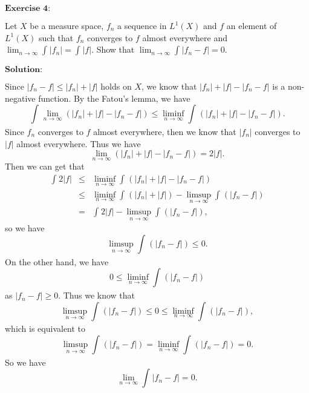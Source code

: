 \documentclass[12pt,a4paper]{ctexart}
\begin{document}
\newpage



$\textbf{Exercise 4:}$

Let $X$ be a measure space, $f_{n}$ a sequence in $L^{1} (X)$ and $f$ an element of $L^{1}(X)$ such that $f_{n}$ converges to $f$ almost everywhere and $\lim_{n \to \infty} \int_{}^{} |f_{n}| = \int_{}^{} |f|$. Show that $\lim_{n \to \infty} \int_{}^{} |f_{n} - f| = 0$.

\vspace{8pt}
$\textbf{Solution:}$

Since $|f_{n} - f| \leq |f_{n}| + |f|$ holds on $X$, we know that $|f_{n}| + |f| - |f_{n} - f|$ is a non-negative function. By the Fatou's lemma, we have
\begin{equation*}
    \int_{}^{} \lim_{n \to \infty} (|f_{n}| + |f| - |f_{n} - f|)  \leq \liminf_{n \to \infty} \int_{}^{} (|f_{n}| + |f| - |f_{n} - f|).
\end{equation*}
Since $f_{n}$ converges to $f$ almost everywhere, then we know that $|f_{n}|$ converges to $|f|$ almost everywhere. Thus we have
\begin{equation*}
    \lim_{n \to \infty} (|f_{n}| + |f| - |f_{n} - f|) = 2 |f|.
\end{equation*}
Then we can get that
\begin{eqnarray*}
\int_{}^{} 2 |f| & \leq & \liminf_{n \to \infty} \int_{}^{} (|f_{n}| + |f| - |f_{n} - f|) \\
& \leq & \liminf_{n \to \infty} \int_{}^{} (|f_{n}| + |f|) - \limsup_{n \to \infty}  \int_{}^{} (|f_{n} - f|) \\
& = & \int_{}^{} 2 |f| - \limsup_{n \to \infty}  \int_{}^{} (|f_{n} - f|),
\end{eqnarray*}
so we have
\begin{equation*}
    \limsup_{n \to \infty}  \int_{}^{} (|f_{n} - f|) \leq 0.
\end{equation*}
On the other hand, we have
\begin{equation*}
    0 \leq \liminf_{n \to \infty}  \int_{}^{} (|f_{n} - f|)
\end{equation*}
as $|f_{n} - f| \geq 0$. Thus we know that
\begin{equation*}
    \limsup_{n \to \infty}  \int_{}^{} (|f_{n} - f|) \leq 0 \leq \liminf_{n \to \infty}  \int_{}^{} (|f_{n} - f|),
\end{equation*}
which is equivalent to
\begin{equation*}
    \limsup_{n \to \infty}  \int_{}^{} (|f_{n} - f|) = \liminf_{n \to \infty}  \int_{}^{} (|f_{n} - f|) = 0.
\end{equation*}
So we have
\begin{equation*}
    \lim_{n \to \infty} \int_{}^{} |f_{n} - f| = 0.
\end{equation*}
\end{document}
